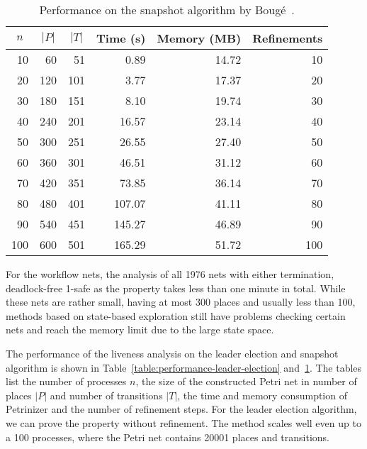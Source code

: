 \begin{table}[t]
  \centering
  \caption{Performance on the snapshot algorithm by Bougé~\cite{Bouge87}.}
\label{table:performance-snapshot}
    \begin{tabular}{rrrrrr}
    \toprule
    \multicolumn{1}{c}{$n$} &
    \multicolumn{1}{c}{$|P|$} &
    \multicolumn{1}{c}{$|T|$} &
    \multicolumn{1}{c}{Time (s)} &
    \multicolumn{1}{c}{Memory (MB)} &
    \multicolumn{1}{c}{Refinements} \\
    \midrule
     10 &  60 &  51 &   0.89 & 14.72 &  10 \\
     20 & 120 & 101 &   3.77 & 17.37 &  20 \\
     30 & 180 & 151 &   8.10 & 19.74 &  30 \\
     40 & 240 & 201 &  16.57 & 23.14 &  40 \\
     50 & 300 & 251 &  26.55 & 27.40 &  50 \\
     60 & 360 & 301 &  46.51 & 31.12 &  60 \\
     70 & 420 & 351 &  73.85 & 36.14 &  70 \\
     80 & 480 & 401 & 107.07 & 41.11 &  80 \\
     90 & 540 & 451 & 145.27 & 46.89 &  90 \\
    100 & 600 & 501 & 165.29 & 51.72 & 100 \\
    \bottomrule
  \end{tabular}
\end{table}

For the workflow nets, the analysis of all 1976 nets with either termination,
deadlock-free 1-safe as the property takes less than one minute in total.
While these nets are rather small, having at most 300 places and usually less than 100,
methods based on state-based exploration still have
problems checking certain nets and reach the memory limit due to the large state space.

The performance of the liveness analysis on the leader election and snapshot algorithm
is shown in Table~\ref{table:performance-leader-election}
and~\ref{table:performance-snapshot}.
The tables list the number of processes $n$, the size of the constructed Petri net
in number of places $|P|$ and number of transitions $|T|$, the time and
memory consumption of Petrinizer and the number of refinement steps.
For the leader election algorithm, we can prove the property without refinement.
The method scales well even up to a 100 processes, where the Petri net
contains 20001 places and transitions.

